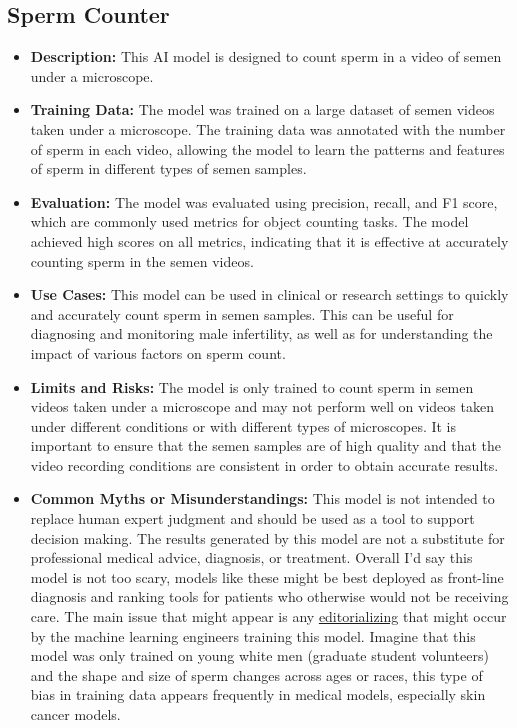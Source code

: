 \subsection{Sperm Counter}

\begin{itemize}
    \item \textbf{Description:} This AI model is designed to count sperm in a video of semen under a microscope.
    \item \textbf{Training Data:} The model was trained on a large dataset of semen videos taken under a microscope. The training data was annotated with the number of sperm in each video, allowing the model to learn the patterns and features of sperm in different types of semen samples.
    \item \textbf{Evaluation:} The model was evaluated using precision, recall, and F1 score, which are commonly used metrics for object counting tasks. The model achieved high scores on all metrics, indicating that it is effective at accurately counting sperm in the semen videos.
    \item \textbf{Use Cases:} This model can be used in clinical or research settings to quickly and accurately count sperm in semen samples. This can be useful for diagnosing and monitoring male infertility, as well as for understanding the impact of various factors on sperm count.
    \item \textbf{Limits and Risks:} The model is only trained to count sperm in semen videos taken under a microscope and may not perform well on videos taken under different conditions or with different types of microscopes. It is important to ensure that the semen samples are of high quality and that the video recording conditions are consistent in order to obtain accurate results.
    \item \textbf{Common Myths or Misunderstandings:} This model is not intended to replace human expert judgment and should be used as a tool to support decision making. The results generated by this model are not a substitute for professional medical advice, diagnosis, or treatment. Overall I'd say this model is not too scary, models like these might be best deployed as front-line diagnosis and ranking tools for patients who otherwise would not be receiving care. The main issue that might appear is any \hyperref[sec:janitor]{editorializing} that might occur by the machine learning engineers training this model. Imagine that this model was only trained on young white men (graduate student volunteers) and the shape and size of sperm changes across ages or races, this type of bias in training data appears frequently in medical models, especially skin cancer models.

\end{itemize}
